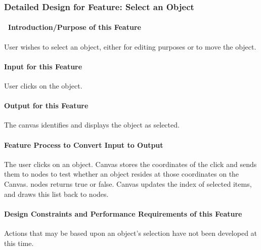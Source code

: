 \documentclass[twoside,letterpaper]{article}
\begin{document}
{\clearpage

\subsubsection{Detailed Design for Feature: Select an Object}

\paragraph[\ Introduction/Purpose of this Feature]
{\ Introduction/Purpose of this Feature}
{\color{black}
User wishes to select an object, either for editing purposes or to move the object.
}

\paragraph[Input for this Feature]{Input for this Feature}
{\color{black}
User clicks on the object.
}

\paragraph{Output for this Feature}
{\color{black}
The canvas identifies and displays the object as selected.
}

\paragraph{Feature Process to Convert Input to Output}
{\color{black}
The user clicks on an object. Canvas stores the coordinates of the click and sends them to nodes to test whether an object resides at those coordinates on the Canvas.  nodes returns true or false. Canvas updates the index of selected items, and draws this list back to nodes.
}

\paragraph{Design Constraints and Performance Requirements of this Feature}
{\color{black}
Actions that may be based upon an object{\textquoteright}s selection have not been developed at this time.
}
\bigskip
\bigskip

}
\end{document}
